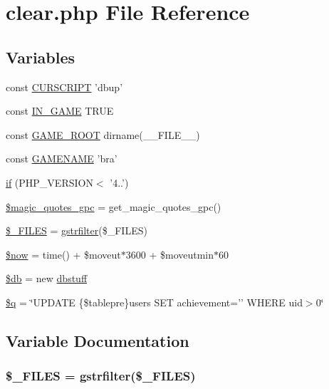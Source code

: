 \hypertarget{clear_8php}{\section{clear.\+php File Reference}
\label{clear_8php}
}
\subsection*{Variables}
\begin{DoxyCompactItemize}
\item 
const \hyperlink{clear_8php_a39c39f525eceb86cabc338804f230e80}{C\+U\+R\+S\+C\+R\+I\+P\+T} 'dbup'
\item 
const \hyperlink{clear_8php_a12c82f3d28569a3f80804f1e72cef14c}{I\+N\+\_\+\+G\+A\+M\+E} T\+R\+U\+E
\item 
const \hyperlink{clear_8php_a8e43cd27c8e744fff590983bc396aba3}{G\+A\+M\+E\+\_\+\+R\+O\+O\+T} dirname(\+\_\+\+\_\+\+F\+I\+L\+E\+\_\+\+\_\+)
\item 
const \hyperlink{clear_8php_a3cd7223880b2f6a1d0bcb325ce43c606}{G\+A\+M\+E\+N\+A\+M\+E} 'bra'
\item 
\hyperlink{clear_8php_ab023ce7e38a92e7f9a721b63855962e9}{if} (P\+H\+P\+\_\+\+V\+E\+R\+S\+I\+O\+N$<$  '4..')
\item 
\hyperlink{clear_8php_a3bf6a6f8faa278d5cceb69655ecdb782}{\$magic\+\_\+quotes\+\_\+gpc} = get\+\_\+magic\+\_\+quotes\+\_\+gpc()
\item 
\hyperlink{clear_8php_a797c40bb61689e5072487a9a8d66843c}{\$\+\_\+\+F\+I\+L\+E\+S} = \hyperlink{global_8func_8php_a2b7ece9137321f3300ce816cab600087}{gstrfilter}(\$\+\_\+\+F\+I\+L\+E\+S)
\item 
\hyperlink{clear_8php_af1d5ccdee975b8f4d20aaffc5b28557c}{\$now} = time() + \$moveut$\ast$3600 + \$moveutmin$\ast$60
\item 
\hyperlink{clear_8php_a1fa3127fc82f96b1436d871ef02be319}{\$db} = new \hyperlink{classdbstuff}{dbstuff}
\item 
\hyperlink{clear_8php_abb0f8f809252372e25f48d52b63ef29d}{\$q} = \char`\"{}U\+P\+D\+A\+T\+E \{\$tablepre\}users S\+E\+T achievement='' W\+H\+E\+R\+E uid$>$0\char`\"{}
\end{DoxyCompactItemize}


\subsection{Variable Documentation}
\hypertarget{clear_8php_a797c40bb61689e5072487a9a8d66843c}{
\subsubsection[{\$\+\_\+\+F\+I\+L\+E\+S}]{\setlength{\rightskip}{0pt plus 5cm}\$\+\_\+\+F\+I\+L\+E\+S = {\bf gstrfilter}(\$\+\_\+\+F\+I\+L\+E\+S)}}\label{clear_8php_a797c40bb61689e5072487a9a8d66843c}


